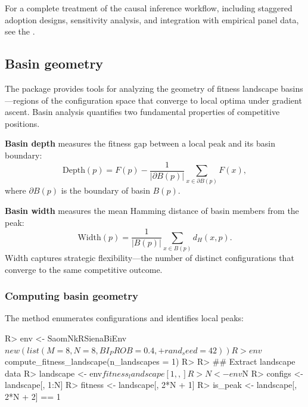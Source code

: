 \documentclass[
  article]{jss}
\begin{document}
For a complete treatment of the causal inference workflow, including
staggered adoption designs, sensitivity analysis, and integration with
empirical panel data, see the
.

\subsection{Basin geometry}\label{sec:basins}

The  package provides tools for analyzing the geometry of
fitness landscape basins---regions of the configuration space that
converge to local optima under gradient ascent. Basin analysis
quantifies two fundamental properties of competitive positions.

\textbf{Basin depth} measures the fitness gap between a local peak and
its basin boundary: \begin{equation}\label{eq:basin-depth}
  \text{Depth}(p) = F(p) - \frac{1}{|\partial B(p)|} \sum_{x \in \partial B(p)} F(x),
\end{equation} where \(\partial B(p)\) is the boundary of basin
\(B(p)\).

\textbf{Basin width} measures the mean Hamming distance of basin members
from the peak: \begin{equation}\label{eq:basin-width}
  \text{Width}(p) = \frac{1}{|B(p)|} \sum_{x \in B(p)} d_H(x, p).
\end{equation} Width captures strategic flexibility---the number of
distinct configurations that converge to the same competitive outcome.

\subsubsection{Computing basin geometry}\label{computing-basin-geometry}

The  method enumerates
configurations and identifies local peaks:

\begin{CodeChunk}
\begin{CodeInput}
R> env <- SaomNkRSienaBiEnv$new(list(M = 8, N = 8, BI_PROB = 0.4,
+                                   rand_seed = 42))
R> env$compute_fitness_landscape(n_landscapes = 1)
R> 
R> ## Extract landscape data
R> landscape <- env$fitness_landscape[1,,]
R> N <- env$N
R> configs  <- landscape[, 1:N]
R> fitness  <- landscape[, 2*N + 1]
R> is_peak  <- landscape[, 2*N + 2] == 1
\end{CodeInput}
\end{CodeChunk}
\end{document}
